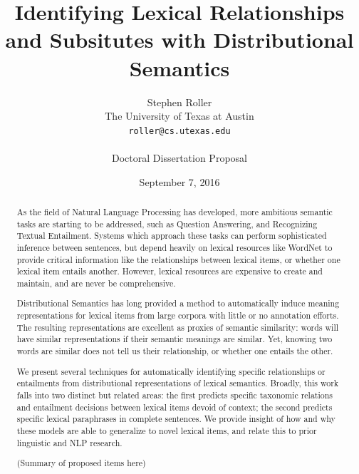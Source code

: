 \documentclass[12pt]{article}
\title{Identifying Lexical Relationships and Subsitutes with Distributional Semantics}
\author{Stephen Roller\\
The University of Texas at Austin\\
{\tt roller@cs.utexas.edu}\\
\\
Doctoral Dissertation Proposal}
\date{September 7, 2016}
\begin{document}
\maketitle

\begin{abstract}
  As the field of Natural Language Processing has developed, more ambitious
  semantic tasks are starting to be addressed, such as Question Answering, and
  Recognizing Textual Entailment. Systems which approach these tasks can
  perform sophisticated inference between sentences, but depend heavily on
  lexical resources like WordNet to provide critical information like the
  relationships between lexical items, or whether one lexical item entails
  another. However, lexical resources are expensive to create and maintain, and
  are never be comprehensive.

  Distributional Semantics has long provided a method to automatically induce
  meaning representations for lexical items from large corpora with little or
  no annotation efforts. The resulting representations are excellent
  as proxies of semantic similarity: words will have similar representations if
  their semantic meanings are similar. Yet, knowing two words are similar does
  not tell us their relationship, or whether one entails the other.

  We present several techniques for automatically identifying specific
  relationships or entailments from distributional representations of lexical
  semantics. Broadly, this work falls into two distinct but related areas: the
  first predicts specific taxonomic relations and entailment decisions between
  lexical items devoid of context; the second predicts specific lexical
  paraphrases in complete sentences.  We provide insight of how and why these
  models are able to generalize to novel lexical items, and relate this to
  prior linguistic and NLP research.

  (Summary of proposed items here)
\end{abstract}
\end{document}
